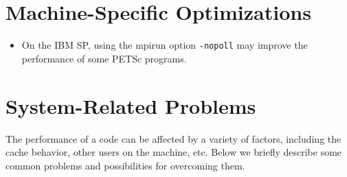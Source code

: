 \section{Machine-Specific Optimizations}

\begin{itemize}
\item On the IBM SP, using the mpirun option {\tt -nopoll} may
      improve the performance of some PETSc programs.
\end{itemize}

\section{System-Related Problems}

The performance of a code can be affected by a variety of factors, 
including the cache behavior, other users on the machine, etc.
Below we briefly describe some common problems and possibilities for
overcoming them.

